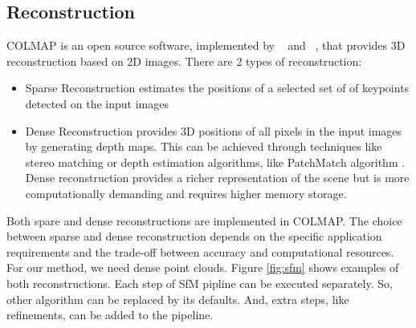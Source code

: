 \documentclass[11pt]{article}
\begin{document}
    \subsection{Reconstruction}
    COLMAP is an open source software, implemented by ~\cite{schoenberger2016sfm} and ~\cite{schoenberger2016mvs},
    that provides 3D reconstruction based on 2D images. There are 2 types of reconstruction:
    \begin{itemize}
        \item Sparse Reconstruction estimates the positions of a selected set of of keypoints detected on the input images
        \item Dense Reconstruction provides 3D positions of all pixels in the input images by generating depth maps. This can be achieved through techniques like stereo matching or depth estimation algorithms, like PatchMatch algorithm \cite{journals/tog/BarnesSFG09}. Dense reconstruction provides a richer representation of the scene but is more computationally demanding and requires higher memory storage.
    \end{itemize}
    Both spare and dense reconstructions are implemented in COLMAP. The choice between sparse and dense reconstruction depends on the specific application requirements and the trade-off between accuracy and computational resources. For our method, we need dense point clouds. Figure \ref{fig:sfm} shows examples of both reconstructions.
    Each step of SfM pipline can be executed separately. So, other algorithm can be replaced by its defaults. And, extra steps, like refinements, can be added to the pipeline.
\end{document}
